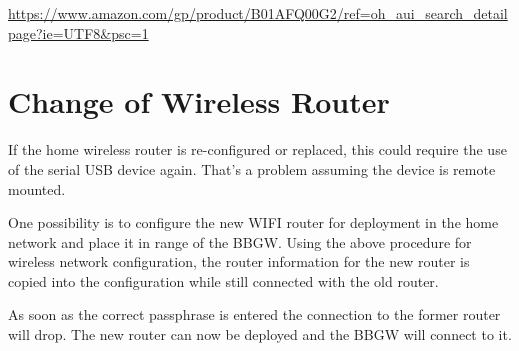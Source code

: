 \url{https://www.amazon.com/gp/product/B01AFQ00G2/ref=oh_aui_search_detailpage?ie=UTF8&psc=1}

\section{Change of Wireless Router}

If the home wireless router is re-configured or replaced, this could require 
the use of the serial USB device again.  That's a problem assuming the device 
is remote mounted.

One possibility is to configure the new WIFI router for deployment in the home 
network and place it in range of the BBGW.  Using the above procedure for 
wireless network configuration, the router information for the new router is 
copied into the configuration while still connected with the old router.

As soon as the correct passphrase is entered the connection to the former 
router will drop.  The new router can now be deployed and the BBGW will connect 
to it.







